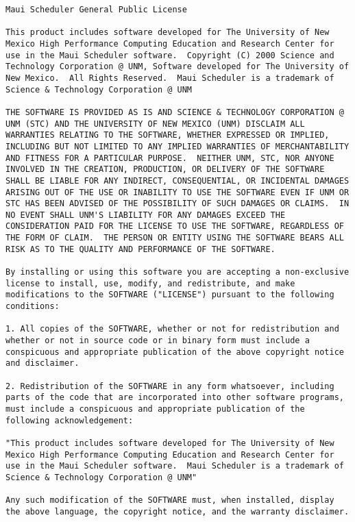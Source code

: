 \begin{verbatim}
Maui Scheduler General Public License

This product includes software developed for The University of New
Mexico High Performance Computing Education and Research Center for
use in the Maui Scheduler software.  Copyright (C) 2000 Science and
Technology Corporation @ UNM, Software developed for The University of
New Mexico.  All Rights Reserved.  Maui Scheduler is a trademark of
Science & Technology Corporation @ UNM

THE SOFTWARE IS PROVIDED AS IS AND SCIENCE & TECHNOLOGY CORPORATION @
UNM (STC) AND THE UNIVERSITY OF NEW MEXICO (UNM) DISCLAIM ALL
WARRANTIES RELATING TO THE SOFTWARE, WHETHER EXPRESSED OR IMPLIED,
INCLUDING BUT NOT LIMITED TO ANY IMPLIED WARRANTIES OF MERCHANTABILITY
AND FITNESS FOR A PARTICULAR PURPOSE.  NEITHER UNM, STC, NOR ANYONE
INVOLVED IN THE CREATION, PRODUCTION, OR DELIVERY OF THE SOFTWARE
SHALL BE LIABLE FOR ANY INDIRECT, CONSEQUENTIAL, OR INCIDENTAL DAMAGES
ARISING OUT OF THE USE OR INABILITY TO USE THE SOFTWARE EVEN IF UNM OR
STC HAS BEEN ADVISED OF THE POSSIBILITY OF SUCH DAMAGES OR CLAIMS.  IN
NO EVENT SHALL UNM'S LIABILITY FOR ANY DAMAGES EXCEED THE
CONSIDERATION PAID FOR THE LICENSE TO USE THE SOFTWARE, REGARDLESS OF
THE FORM OF CLAIM.  THE PERSON OR ENTITY USING THE SOFTWARE BEARS ALL
RISK AS TO THE QUALITY AND PERFORMANCE OF THE SOFTWARE.

By installing or using this software you are accepting a non-exclusive
license to install, use, modify, and redistribute, and make
modifications to the SOFTWARE ("LICENSE") pursuant to the following
conditions:

1. All copies of the SOFTWARE, whether or not for redistribution and
whether or not in source code or in binary form must include a
conspicuous and appropriate publication of the above copyright notice
and disclaimer.

2. Redistribution of the SOFTWARE in any form whatsoever, including
parts of the code that are incorporated into other software programs,
must include a conspicuous and appropriate publication of the
following acknowledgement:

"This product includes software developed for The University of New
Mexico High Performance Computing Education and Research Center for
use in the Maui Scheduler software.  Maui Scheduler is a trademark of
Science & Technology Corporation @ UNM"

Any such modification of the SOFTWARE must, when installed, display
the above language, the copyright notice, and the warranty disclaimer.


\end{verbatim}
